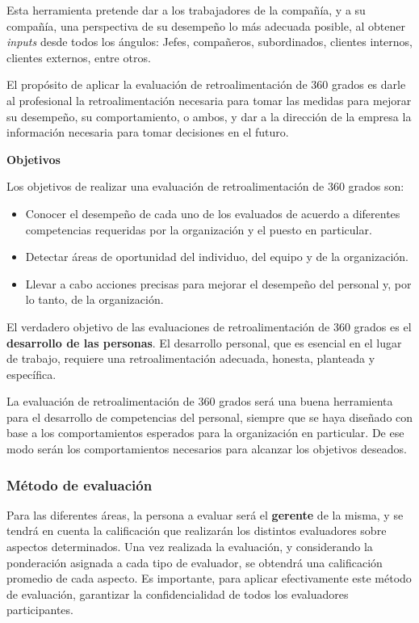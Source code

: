 Esta herramienta pretende dar a los trabajadores de la compañía, y a su compañía, una perspectiva de su desempeño lo más adecuada posible, al obtener \textit{inputs} desde todos los ángulos: Jefes, compañeros, subordinados, clientes internos, clientes externos, entre otros.

El propósito de aplicar la evaluación de retroalimentación de 360 grados es darle al profesional la retroalimentación necesaria para tomar las medidas para mejorar su desempeño, su comportamiento, o ambos, y dar a la dirección de la empresa la información necesaria para tomar decisiones en el futuro.


\textbf{Objetivos}

Los objetivos de realizar una evaluación de retroalimentación de 360 grados son:

\begin{itemize}
    \item Conocer el desempeño de cada uno de los evaluados de acuerdo a diferentes competencias requeridas por la organización y el puesto en particular.
    \item Detectar áreas de oportunidad del individuo, del equipo y de la organización.
    \item Llevar a cabo acciones precisas para mejorar el desempeño del personal y, por lo  tanto, de la organización.
\end{itemize}

El verdadero objetivo de las evaluaciones de retroalimentación de 360 grados es el \textbf{desarrollo de las personas}.
El desarrollo personal, que es esencial en el lugar de trabajo, requiere una retroalimentación adecuada, honesta, planteada y específica.

La evaluación de retroalimentación de 360 grados será una buena herramienta para el desarrollo de competencias del personal, siempre que se haya diseñado con base a los comportamientos esperados para la organización en particular.
De ese modo serán los comportamientos necesarios para alcanzar los objetivos deseados.


\subsubsection{Método de evaluación}

Para las diferentes áreas, la persona a evaluar será el \textbf{gerente} de la misma, y se tendrá en cuenta la calificación que realizarán los distintos evaluadores sobre aspectos determinados.
Una vez realizada la evaluación, y considerando la ponderación asignada a cada tipo de evaluador, se obtendrá una calificación promedio de cada aspecto.
Es importante, para aplicar efectivamente este método de evaluación, garantizar la confidencialidad de todos los evaluadores participantes.


